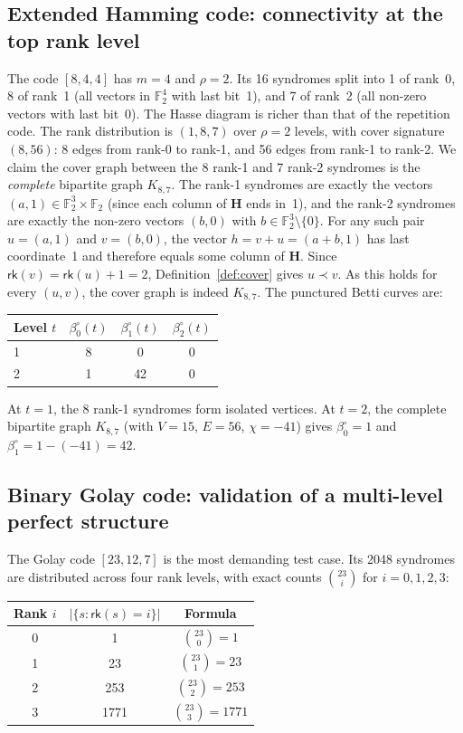 \documentclass[11pt,twoside,leqno]{article}
\theoremstyle{definition}
\theoremstyle{plain}
\theoremstyle{remark}
\newcommand{\Ftwo}{\mathbb{F}_2}
\newcommand{\rk}{\mathsf{rk}}
\newcommand{\HH}{\mathbf{H}}
\newcommand{\covrad}{\rho}
\begin{document}
\subsection{Extended Hamming code: connectivity at the top rank level}
\label{sec:res:exthamming}

The code $[8,4,4]$ has $m=4$ and $\covrad=2$. Its 16 syndromes split into 1 of rank~0,
8 of rank~1 (all vectors in $\Ftwo^4$ with last bit~1), and 7 of rank~2 (all non-zero vectors
with last bit~0). The Hasse diagram is richer than that of the repetition code.
The rank distribution is $(1,8,7)$ over $\covrad=2$ levels, with cover signature $(8,56)$:
8 edges from rank-0 to rank-1, and 56 edges from rank-1 to rank-2. We claim the cover graph between the 8 rank-1 and 7 rank-2 syndromes is the \emph{complete}
bipartite graph $K_{8,7}$. The rank-1 syndromes are exactly the vectors $(a,1)\in\Ftwo^3\times\Ftwo$
(since each column of $\HH$ ends in~1), and the rank-2 syndromes are exactly the non-zero vectors
$(b,0)$ with $b\in\Ftwo^3\setminus\{0\}$. For any such pair $u=(a,1)$ and $v=(b,0)$, the vector
$h=v+u=(a+b,1)$ has last coordinate~1 and therefore equals some column of $\HH$. Since
$\rk(v)=\rk(u)+1=2$, Definition~\ref{def:cover} gives $u\prec v$. As this holds for every
$(u,v)$, the cover graph is indeed $K_{8,7}$. The punctured Betti curves are:
\begin{center}
\begin{tabular}{lccc}
\toprule
Level $t$ & $\beta_0^\circ(t)$ & $\beta_1^\circ(t)$ & $\beta_2^\circ(t)$ \\
\midrule
1 & 8 & 0 & 0 \\
2 & 1 & 42 & 0 \\
\bottomrule
\end{tabular}
\end{center}
At $t=1$, the 8 rank-1 syndromes form isolated vertices. At $t=2$, the complete bipartite
graph $K_{8,7}$ (with $V=15$, $E=56$, $\chi=-41$) gives $\beta_0^\circ=1$ and
$\beta_1^\circ = 1-(-41) = 42$.

\subsection{Binary Golay code: validation of a multi-level perfect structure}
\label{sec:res:golay}

The Golay code $[23,12,7]$ is the most demanding test case. Its 2048 syndromes are distributed
across four rank levels, with exact counts $\binom{23}{i}$ for $i=0,1,2,3$:

\begin{center}
\begin{tabular}{ccc}
\toprule
Rank $i$ & $|\{s:\rk(s)=i\}|$ & Formula \\
\midrule
0 & 1 & $\binom{23}{0}=1$ \\
1 & 23 & $\binom{23}{1}=23$ \\
2 & 253 & $\binom{23}{2}=253$ \\
3 & 1771 & $\binom{23}{3}=1771$ \\
\bottomrule
\end{tabular}
\end{center}
\end{document}
